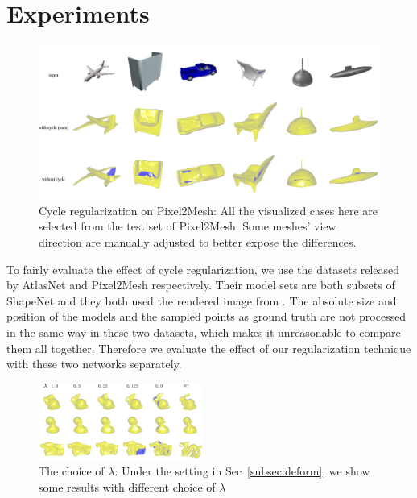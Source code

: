 \section{Experiments}
\begin{figure}[t]
	\centering
	\includegraphics[width=\linewidth]{img/p2m/final}
	\caption{Cycle regularization on Pixel2Mesh: All the visualized cases here are selected from the test set of Pixel2Mesh. Some meshes' view direction are manually adjusted to better expose the differences.}
	\label{fig:p2m}
\end{figure}
 To fairly evaluate the effect of cycle regularization, we use the datasets released by AtlasNet and Pixel2Mesh respectively. Their model sets are both subsets of ShapeNet \cite{shapenetdata} and they both used the rendered image from \cite{3DR2N2}. The absolute size and position of the models and the sampled points as ground truth are not processed in the same way in these two datasets, which makes it unreasonable to compare them all together. Therefore we evaluate the effect of our regularization technique with these two networks separately.

\begin{figure}
	\begin{center}
		\includegraphics[width=0.48\textwidth]{img/opt/lambda}
	\end{center}
	\caption{The choice of $\lambda$: Under the setting in Sec~\ref{subsec:deform}, we show some results with different choice of $\lambda$}
	\label{fig:lambda}
\end{figure}

